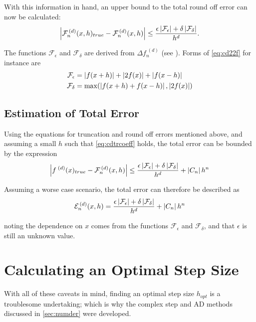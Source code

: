 With this information in hand, an upper bound to the total round off error can now be calculated:
\begin{equation}
 \left\lvert \mathcal{F}_n^{\,(d)}(x,h)_{true}-\mathcal{F}_n^{\,(d)}(x,h)\right\rvert \leq \frac{\epsilon\left\lvert \mathcal{F}_\epsilon\right\rvert+\delta\left\lvert \mathcal{F}_\delta\right\rvert}{h^d}.
\end{equation}

The functions $\mathcal{F}_\epsilon$ and $\mathcal{F}_\delta$ are derived from $\Delta f_n^{\;(d)}$ (see ).
Forms of \cref{eq:cd22f} for instance are
\begin{align}
\mathcal{F}_\epsilon &= \left\lvert f(x+h)\right\rvert + \left\lvert 2f(x)\right\rvert + \left\lvert f(x-h)\right\rvert \\
\mathcal{F}_\delta &= \max(\left\lvert f(x+h) + f(x-h)\right\rvert,\left\lvert 2f(x)\right\rvert)
\end{align}

\subsection{Estimation of Total Error}

Using the equations for truncation and round off errors mentioned above, and assuming a small $h$ such that \cref{eq:cdtrcoeff} holds, the total error can be bounded by the expression
\begin{equation}
\left\lvert f^{\;(d)}(x)_{true}-\mathcal{F}_n^{\,(d)}(x,h)\right\rvert \leq \frac{\epsilon\left\lvert \mathcal{F}_\epsilon\right\rvert+\delta\left\lvert \mathcal{F}_\delta\right\rvert}{h^d} + \left\lvert C_n\right\rvert h^n
\end{equation}

Assuming a worse case scenario, the total error can therefore be described as
\begin{equation}
\mathcal{E}_n^{\,(d)}(x,h) = \frac{\epsilon\left\lvert \mathcal{F}_\epsilon\right\rvert+\delta\left\lvert \mathcal{F}_\delta\right\rvert}{h^d} + \left\lvert C_n\right\rvert h^n\label{eq:cnetot}
\end{equation}

noting the dependence on $x$ comes from the functions $\mathcal{F}_\epsilon$ and $\mathcal{F}_\delta$, and that $\epsilon$ is still an unknown value.

\section{Calculating an Optimal Step Size}\label{sec:hopt}

With all of these caveats in mind, finding an optimal step size $h_{opt}$ is a troublesome undertaking; which is why the complex step and AD methods discussed in \cref{sec:numder} were developed.

